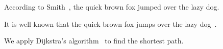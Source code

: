 According to Smith~\cite{smith14}, the quick brown fox jumped
over the lazy dog.

It is well known that the quick brown fox jumps over the lazy
dog~\cite{smith14}.

We apply Dijkstra's algorithm~\cite{dijkstra59} to find the
shortest path.
